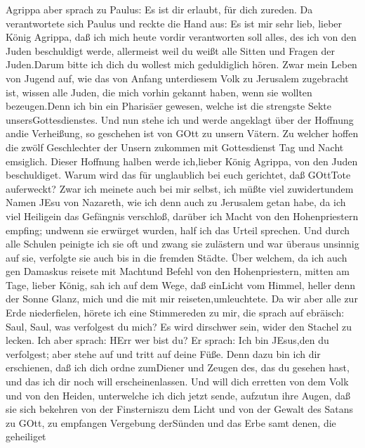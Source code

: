  Agrippa aber sprach zu Paulus: Es ist dir erlaubt, für dich
zureden. Da verantwortete sich Paulus und reckte die Hand aus:
 Es ist mir sehr lieb, lieber König Agrippa, daß ich mich
heute vordir verantworten soll alles, des ich von den Juden beschuldigt
werde,  allermeist weil du weißt alle Sitten und Fragen der
Juden.Darum bitte ich dich du wollest mich geduldiglich hören.
 Zwar mein Leben von Jugend auf, wie das von Anfang
unterdiesem Volk zu Jerusalem zugebracht ist, wissen alle Juden,
 die mich vorhin gekannt haben, wenn sie wollten
bezeugen.Denn ich bin ein Pharisäer gewesen, welche ist die strengste
Sekte unsersGottesdienstes.  Und nun stehe ich und werde
angeklagt über der Hoffnung andie Verheißung, so geschehen ist von GOtt
zu unsern Vätern.  Zu welcher hoffen die zwölf Geschlechter
der Unsern zukommen mit Gottesdienst Tag und Nacht emsiglich. Dieser
Hoffnung halben werde ich,lieber König Agrippa, von den Juden
beschuldiget.  Warum wird das für unglaublich bei euch
gerichtet, daß GOttTote auferweckt?  Zwar ich meinete auch
bei mir selbst, ich müßte viel zuwidertundem Namen JEsu von Nazareth,
 wie ich denn auch zu Jerusalem getan habe, da ich viel
Heiligein das Gefängnis verschloß, darüber ich Macht von den
Hohenpriestern empfing; undwenn sie erwürget wurden, half ich das Urteil
sprechen.  Und durch alle Schulen peinigte ich sie oft und
zwang sie zulästern und war überaus unsinnig auf sie, verfolgte sie auch
bis in die fremden Städte.  Über welchem, da ich auch gen
Damaskus reisete mit Machtund Befehl von den Hohenpriestern,
 mitten am Tage, lieber König, sah ich auf dem Wege, daß
einLicht vom Himmel, heller denn der Sonne Glanz, mich und die mit mir
reiseten,umleuchtete.  Da wir aber alle zur Erde
niederfielen, hörete ich eine Stimmereden zu mir, die sprach auf
ebräisch: Saul, Saul, was verfolgest du mich? Es wird dirschwer sein,
wider den Stachel zu lecken.  Ich aber sprach: HErr wer
bist du? Er sprach: Ich bin JEsus,den du verfolgest; aber stehe auf und
tritt auf deine Füße.  Denn dazu bin ich dir erschienen,
daß ich dich ordne zumDiener und Zeugen des, das du gesehen hast, und
das ich dir noch will erscheinenlassen.  Und will dich
erretten von dem Volk und von den Heiden, unterwelche ich dich jetzt
sende,  aufzutun ihre Augen, daß sie sich bekehren von der
Finsterniszu dem Licht und von der Gewalt des Satans zu GOtt, zu
empfangen Vergebung derSünden und das Erbe samt denen, die geheiliget
